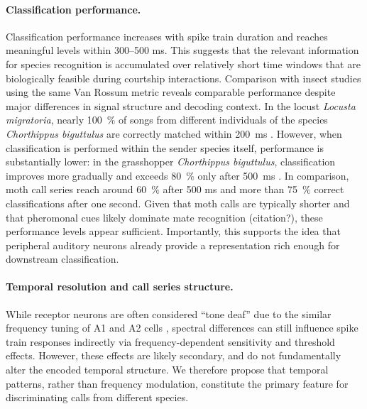 \documentclass[12pt,a4paper]{article}
\newcommand{\species}[1]{\textit{#1}}
\newcommand{\percent}[1]{#1~$\%$}
\begin{document}
\paragraph{Classification performance.}
Classification performance increases with spike train duration and reaches meaningful levels within 300–500 ms. This suggests that the relevant information for species recognition is accumulated over relatively short time windows that are biologically feasible during courtship interactions. Comparison with insect studies using the same Van Rossum metric reveals comparable performance despite major differences in signal structure and decoding context. In the locust \species{Locusta migratoria}, nearly \percent{100} of songs from different individuals of the species \species{Chorthippus biguttulus} are correctly matched within 200~ms \parencite{machens_discrimination_2001}. However, when classification is performed within the sender species itself, performance is substantially lower: in the grasshopper \species{Chorthippus biguttulus}, classification improves more gradually and exceeds \percent{80} only after 500~ms \parencite{machens_single_2003}. In comparison, moth call series reach around \percent{60} after 500 ms and more than \percent{75} correct classifications after one second. Given that moth calls are typically shorter and that pheromonal cues likely dominate mate recognition (citation?), these performance levels appear sufficient. Importantly, this supports the idea that peripheral auditory neurons already provide a representation rich enough for downstream classification.

\paragraph{Temporal resolution and call series structure.}
While receptor neurons are often considered “tone deaf” due to the similar frequency tuning of A1 and A2 cells \parencite{waters_bats_2003, mora_tonedeaf_2014}, spectral differences can still influence spike train responses indirectly via frequency-dependent sensitivity and threshold effects. However, these effects are likely secondary, and do not fundamentally alter the encoded temporal structure. We therefore propose that temporal patterns, rather than frequency modulation, constitute the primary feature for discriminating calls from different species. 
\end{document}
